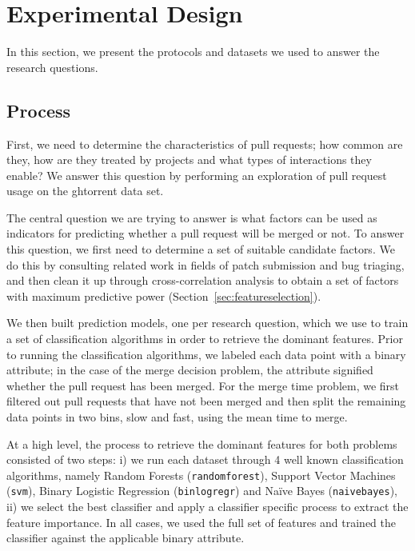 \documentclass{sig-alternate}
\begin{document}
\section{Experimental Design}

In this section, we present the protocols and datasets we used to 
answer the research questions.

\subsection{Process}
\label{sec:expprocess}
First, we need to determine the characteristics of pull requests; how
common are they, how are they treated by projects and what types of 
interactions they enable? We answer this question by performing an
exploration of pull request usage on the {\sc ght}orrent data set. 

The central question we are trying to answer is what factors can be used as
indicators for predicting whether a pull request will be merged or not.  To
answer this question, we first need to determine a set of suitable candidate
factors. We do this by consulting related work in fields of patch submission and
bug triaging, and then clean it up through cross-correlation analysis to obtain
a set of factors with maximum predictive power (Section~\ref{sec:featureselection}).

We then built prediction models, one per research question, which we use to
train a set of classification algorithms in order to retrieve the dominant
features. Prior to running the classification algorithms, we labeled each data
point with a binary attribute; in the case of the merge decision problem, the
attribute signified whether the pull request has been merged. For the merge time
problem, we first filtered out pull requests that have not been merged and then
split the remaining data points in two bins, slow and fast, using the mean time
to merge.

At a high level, the process to retrieve the dominant features for both
problems consisted of two steps: i) we run each dataset through 4 well known
classification algorithms, namely Random Forests (\texttt{randomforest}),
Support Vector Machines (\texttt{svm}), Binary Logistic Regression
(\texttt{binlogregr}) and Na\"ive Bayes (\texttt{naivebayes}), ii) we select
the best classifier and apply a classifier specific process to extract the
feature importance. In all cases, we used the full set of features and
trained the classifier against the applicable binary attribute.
\end{document}
